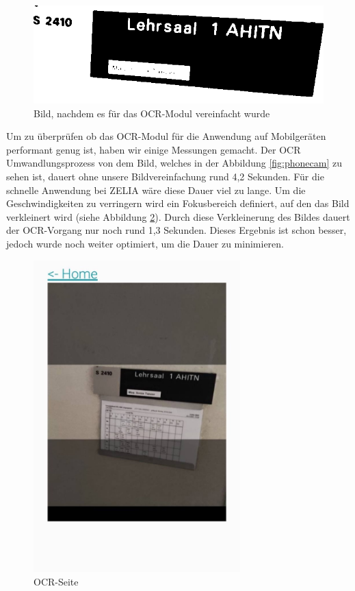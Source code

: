 \begin{figure}
    \centering
    \includegraphics[width=120mm]{media/OCR/compressed}
    \caption{Bild, nachdem es für das OCR-Modul vereinfacht wurde}
    \label{ocroptimised}
\end{figure}


\pagebreak


Um zu überprüfen ob das OCR-Modul für die Anwendung auf Mobilgeräten performant genug ist, haben wir einige Messungen gemacht. Der OCR Umwandlungsprozess von dem Bild, welches in der Abbildung \ref{fig:phonecam} zu sehen ist, dauert ohne unsere Bildvereinfachung rund 4,2 Sekunden. Für die schnelle Anwendung bei ZELIA wäre diese Dauer viel zu lange. Um die Geschwindigkeiten zu verringern wird ein Fokusbereich definiert, auf den das Bild verkleinert wird (siehe Abbildung \ref{fig:ocrfocus}). Durch diese Verkleinerung des Bildes dauert der OCR-Vorgang nur noch rund 1,3 Sekunden. Dieses Ergebnis ist schon besser, jedoch wurde noch weiter optimiert, um die Dauer zu minimieren. 

\begin{figure}[H]
    \centering
    \includegraphics[width=80mm]{media/WebComponents/OCRSeite_light.jpg}
    \caption{OCR-Seite}
    \label{fig:ocrfocus}
\end{figure}

